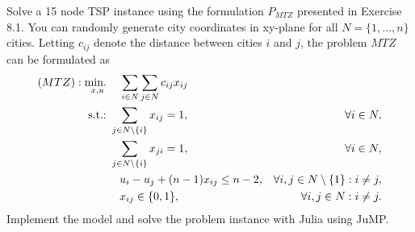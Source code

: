 Solve a 15 node TSP instance using the formulation $P_{MTZ}$ presented in Exercise 8.1. You can randomly generate city coordinates in xy-plane for all $N = \{1,\dots,n\}$ cities. Letting $c_{ij}$ denote the distance between cities $i$ and $j$, the problem $MTZ$ can be formulated as
%
\begin{align*}
	(MTZ) : \mathop{\text{min.~}}_{x,u} & ~~\,\sum_{i\in N}\sum_{j\in N} c_{ij}x_{ij}\\
		    \mathop{\text{s.t.:~}} & \sum_{j \in N \setminus \{i\}} x_{ij} = 1, & \forall i \in N, \\
		        & \sum_{j \in N \setminus \{i\}} x_{ji} = 1, & \forall i \in N, \\   
		        & ~~\,u_{i} - u_{j} + (n-1) x_{ij} \leq n - 2, & \forall i,j \in N \setminus \{ 1 \} : i \neq j,\\
		        & ~~\,x_{ij} \in \{0,1\}, & \forall i,j \in N : i\neq j.
\end{align*}
%
Implement the model and solve the problem instance with Julia using JuMP.